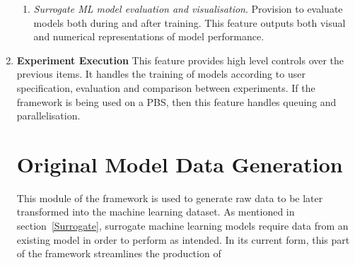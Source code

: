 \begin{enumerate}
\begin{enumerate}[label=\roman*.]
		\item \textit{Surrogate ML model evaluation and visualisation}. Provision to evaluate models both during and after training. This feature outputs both visual and numerical representations of model performance. 
		
	\end{enumerate}
	
	\item \textbf{Experiment Execution} This feature provides high level controls over the previous items. It handles the training of models according to user specification, evaluation and comparison between experiments. If the framework is being used on a PBS, then this feature handles queuing and parallelisation.
	
	\section{Original Model Data Generation}
	
	This module of the framework is used to generate raw data to be later transformed into the machine learning dataset. As mentioned in section~\ref{Surrogate}, surrogate machine learning models require data from an existing model in order to perform as intended. In its current form, this part of the framework streamlines the production of 

\end{enumerate}


